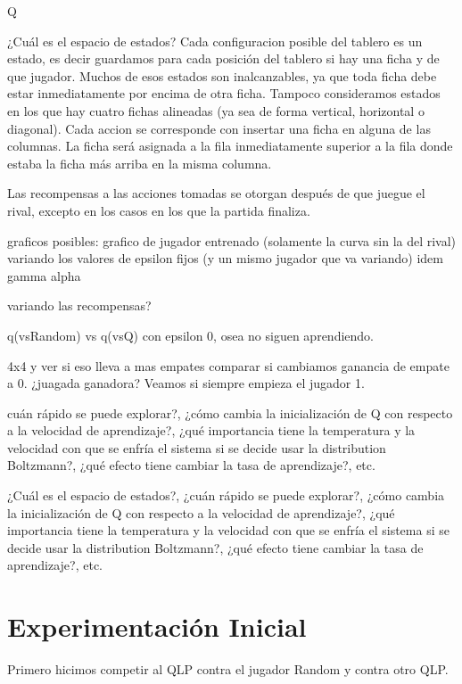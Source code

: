 \documentclass[10pt, a4paper]{article}
\begin{document}
Q

¿Cuál es el espacio de estados?
Cada configuracion posible del tablero es un estado, es decir guardamos para cada posición del tablero si hay una ficha y de que jugador. Muchos de esos estados son inalcanzables, ya que toda ficha debe estar inmediatamente por encima de otra ficha. Tampoco consideramos estados en los que hay cuatro fichas alineadas (ya sea de forma vertical, horizontal o diagonal). 
Cada accion se corresponde con insertar una ficha en alguna de las columnas. La ficha será asignada a la fila inmediatamente superior a la fila donde estaba la ficha más arriba en la misma columna.

Las recompensas a las acciones tomadas se otorgan después de que juegue el rival, excepto en los casos en los que la partida finaliza.

graficos posibles:
grafico de jugador entrenado (solamente la curva sin la del rival) variando los valores de epsilon fijos (y un mismo jugador que va variando)
idem gamma
alpha

variando las recompensas?

q(vsRandom) vs q(vsQ) con epsilon 0, osea no siguen aprendiendo.


4x4 y ver si eso lleva a  mas empates
comparar si cambiamos ganancia de empate a 0.
¿juagada ganadora? Veamos si siempre empieza el jugador 1.


cuán rápido se puede explorar?, ¿cómo cambia la inicialización de Q con respecto a la velocidad de aprendizaje?, ¿qué importancia tiene la temperatura y la velocidad con que se enfría el sistema si se decide usar la distribution Boltzmann?, ¿qué efecto tiene cambiar la tasa de aprendizaje?, etc.


¿Cuál es el espacio de estados?, ¿cuán rápido se puede explorar?, ¿cómo cambia la inicialización de Q con respecto a la velocidad de aprendizaje?, ¿qué importancia tiene la temperatura y la velocidad con que se enfría el sistema si se decide usar la distribution Boltzmann?, ¿qué efecto tiene cambiar la tasa de aprendizaje?, etc.

\section{Experimentación Inicial}

Primero hicimos competir al QLP contra el jugador Random y contra otro QLP.
\end{document}
